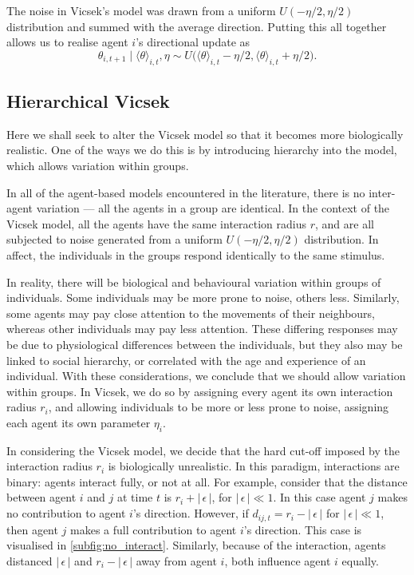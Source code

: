 The noise in Vicsek's model was drawn from a uniform $U(-\eta/2, \eta/2)$ distribution and summed with the average direction. Putting this all together allows us to realise agent $i$'s directional update as
\begin{equation}
\label{eq:vicsek_update}
	\theta_{i,t+1} \mid \langle \theta \rangle_{i, t}, \eta \sim U\big(\langle \theta \rangle_{i, t} -\eta/2, \langle \theta \rangle_{i, t} + \eta/2\big).
\end{equation}

\subsection{Hierarchical Vicsek}
\label{ssec:general_vicsek}

Here we shall seek to alter the Vicsek model so that it becomes more biologically realistic. One of the ways we do this is by introducing hierarchy into the model, which allows variation within groups. 

In all of the agent-based models encountered in the literature, there is no inter-agent variation --- all the agents in a group are identical. In the context of the Vicsek model, all the agents have the same interaction radius $r$, and are all subjected to noise generated from a uniform $U(-\eta/2, \eta/2)$ distribution. In affect, the individuals in the groups respond identically to the same stimulus.


In reality, there will be biological and behavioural variation within groups of individuals. Some individuals may be more prone to noise, others less. Similarly, some agents may pay close attention to the movements of their neighbours, whereas other individuals may pay less attention. These differing responses may be due to physiological differences between the individuals, but they also may be linked to social hierarchy, or correlated with the age and experience of an individual. With these considerations, we conclude that we should allow variation within groups. In Vicsek, we do so by assigning every agent its own interaction radius $r_i$, and allowing individuals to be more or less prone to noise, assigning each agent its own parameter $\eta_i$.

In considering the Vicsek model, we decide that the hard cut-off imposed by the interaction radius $r_i$ is biologically unrealistic. In this paradigm, interactions are binary: agents interact fully, or not at all. For example, consider that the distance between agent $i$ and $j$ at time $t$ is  $r_i + |\, \epsilon \,|$, for $|\, \epsilon \, | \ll 1$. In this case agent $j$ makes no contribution to agent $i$'s direction. However, if $d_{ij, t} = r_i - |\, \epsilon\,| $ for $|\, \epsilon \,| \ll 1$, then agent $j$ makes a full contribution to agent $i$'s direction. This case is visualised in \cref{subfig:no_interact}. Similarly, because of the interaction, agents distanced $|\,\epsilon\,|$ and $r_i - |\,\epsilon\,|$ away from agent $i$, both influence agent $i$ equally.

